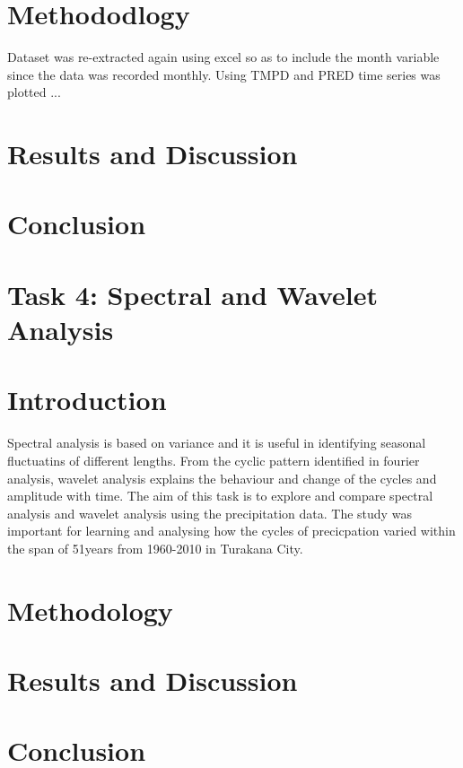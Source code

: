 \documentclass[12pt,a4paper]{article}
\begin{document}
\section{Methododlogy}
Dataset was re-extracted again using excel so as to include the month variable since the data was recorded monthly. Using TMPD and PRED time series was plotted ...
\section{Results and Discussion}
\section{Conclusion}
\section{Task 4: Spectral and Wavelet Analysis}
\section{Introduction}
Spectral analysis is based on variance and it is useful in identifying seasonal fluctuatins of different lengths. From the cyclic pattern identified in fourier analysis, wavelet analysis explains the behaviour and change of the cycles and amplitude with time. The aim of this task is to explore and compare spectral analysis and wavelet analysis using the precipitation data. The study was important for learning and analysing how the cycles of precicpation varied within the span of 51years from  1960-2010 in Turakana City.
\section{Methodology}
\section{Results and Discussion}
\section{Conclusion}
\end{document}
